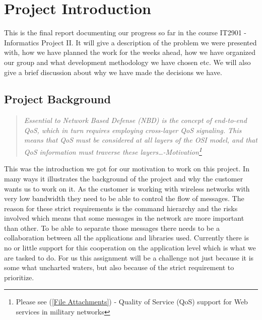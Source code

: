 \section{Project Introduction}\label{Project Introduction}
    This is the final report documenting our progress so far in the course IT2901 - Informatics Project II. It will give a description of the problem we were presented with, how we have planned the work for the weeks ahead, how we have organized our group and what development methodology we have chosen etc. We will also give a brief discussion about why we have made the decisions we have.
    
    \subsection{Project Background}\label{Project Background}
    \begin{quotation}
    \em Essential to Network Based Defense (NBD) is the concept of end-to-end QoS, which in turn requires employing cross-layer QoS signaling. This means that QoS must be considered at all layers of the OSI model, and that QoS information must traverse these layers\ldots -Motivation\footnote{Please see (\ref{File Attachments}) - Quality of Service (QoS) support for Web services in military networks}
    \end{quotation}
    This was the introduction we got for our motivation to work on this project. In many ways it illustrates the background of the project and why the customer wants us to work on it. As the customer is working with wireless networks with very low bandwidth they need to be able to control the flow of messages. The reason for these strict requirements is the command hierarchy and the risks involved which means that some messages in the network are more important than other. To be able to separate those messages there needs to be a collaboration between all the applications and libraries used. Currently there is no or little support for this cooperation on the application level which is what we are tasked to do. For us this assignment will be a challenge not just because it is some what uncharted waters, but also because of the strict requirement to prioritize.

